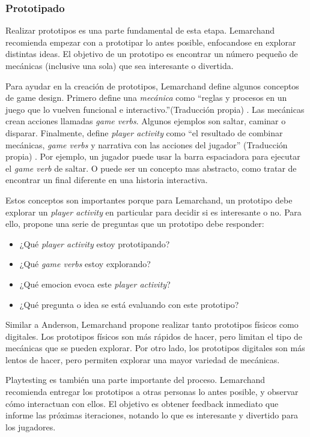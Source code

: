 \subsubsection{Prototipado}
\par Realizar prototipos es una parte fundamental de esta etapa. Lemarchand recomienda empezar con a prototipar lo antes posible, enfocandose en explorar distintas ideas. El objetivo de un prototipo es encontrar un número pequeño de mecánicas (inclusive una sola) que sea interesante o divertida. 
\par Para ayudar en la creación de prototipos, Lemarchand define algunos conceptos de game design. Primero define una \textit{mecánica} como ``reglas y procesos en un juego que lo vuelven funcional e interactivo.''(Traducción propia) \cite{lemarchandPlayfulProductionProcess2021}. Las mecánicas crean acciones llamadas \textit{game verbs}. Algunos ejemplos son saltar, caminar o disparar. Finalmente, define \textit{player activity} como ``el resultado de combinar mecánicas, \textit{game verbs} y narrativa con las acciones del jugador'' (Traducción propia) \cite{lemarchandPlayfulProductionProcess2021}. Por ejemplo, un jugador puede usar la barra espaciadora para ejecutar el \textit{game verb} de saltar. O puede ser un concepto mas abstracto, como tratar de encontrar un final diferente en una historia interactiva.
\par Estos conceptos son importantes porque para Lemarchand, un prototipo debe explorar un \textit{player activity} en particular para decidir si es interesante o no. Para ello, propone una serie de preguntas que un prototipo debe responder:
\begin{itemize}
    \item ¿Qué \textit{player activity} estoy prototipando?
    \item ¿Qué \textit{game verbs} estoy explorando?
    \item ¿Qué emocion evoca este \textit{player activity}?
    \item ¿Qué pregunta o idea se está evaluando con este prototipo?  
\end{itemize}
\bigbreak
\par Similar a Anderson, Lemarchand propone realizar tanto prototipos físicos como digitales. Los prototipos físicos son más rápidos de hacer, pero limitan el tipo de mecánicas que se pueden explorar. Por otro lado, los prototipos digitales son más lentos de hacer, pero permiten explorar una mayor variedad de mecánicas.
\par Playtesting es también una parte importante del proceso. Lemarchand recomienda entregar los prototipos a otras personas lo antes posible, y observar cómo interactuan con ellos. El objetivo es obtener feedback inmediato que informe las próximas iteraciones, notando lo que es interesante y divertido para los jugadores.
%
%
